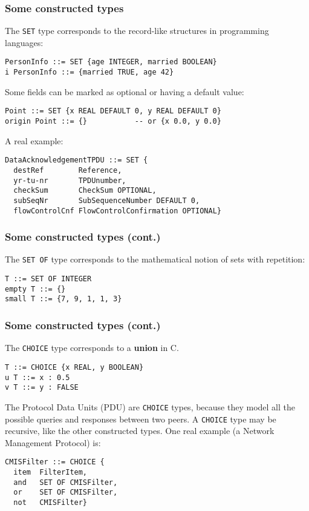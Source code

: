 \documentclass[compress,dvips,xcolor={dvipsnames},t]{beamer}
\begin{document}
\begin{frame}[containsverbatim]
\frametitle{Some constructed types}

The \texttt{SET} type corresponds to the record-like structures in
programming languages:
\begin{verbatim}
PersonInfo ::= SET {age INTEGER, married BOOLEAN}
i PersonInfo ::= {married TRUE, age 42}
\end{verbatim}
Some fields can be marked as optional or having a default value:
\begin{verbatim}
Point ::= SET {x REAL DEFAULT 0, y REAL DEFAULT 0}
origin Point ::= {}           -- or {x 0.0, y 0.0}
\end{verbatim}
A real example:
\begin{verbatim}
DataAcknowledgementTPDU ::= SET {
  destRef        Reference,
  yr-tu-nr       TPDUnumber,
  checkSum       CheckSum OPTIONAL,
  subSeqNr       SubSequenceNumber DEFAULT 0,
  flowControlCnf FlowControlConfirmation OPTIONAL}
\end{verbatim}

\end{frame}

\begin{frame}[containsverbatim]
\frametitle{Some constructed types (cont.)}

The \texttt{SET OF} type corresponds to the mathematical notion of
sets with repetition:
\begin{verbatim}
T ::= SET OF INTEGER
empty T ::= {}
small T ::= {7, 9, 1, 1, 3}
\end{verbatim}

\end{frame}

\begin{frame}[containsverbatim]
\frametitle{Some constructed types (cont.)}

The \texttt{CHOICE} type corresponds to a \textbf{union} in C.
\begin{verbatim}
T ::= CHOICE {x REAL, y BOOLEAN}
u T ::= x : 0.5
v T ::= y : FALSE
\end{verbatim}
The Protocol Data Units (PDU) are \texttt{CHOICE} types, because they
model all the possible queries and responses between two peers. A
\texttt{CHOICE} type may be recursive, like the other constructed
types. One real example (a Network Management Protocol) is:
\begin{verbatim}
CMISFilter ::= CHOICE {
  item  FilterItem,
  and   SET OF CMISFilter,
  or    SET OF CMISFilter,
  not   CMISFilter}
\end{verbatim}

\end{frame}
\end{document}
